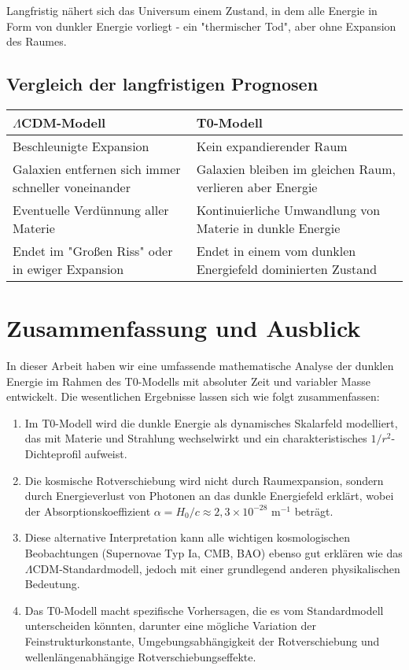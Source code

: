 \documentclass[a4paper,12pt]{article}
\theoremstyle{definition}
\theoremstyle{remark}
\begin{document}
	Langfristig nähert sich das Universum einem Zustand, in dem alle Energie in Form von dunkler Energie vorliegt - ein "thermischer Tod", aber ohne Expansion des Raumes.
	
	\subsection{Vergleich der langfristigen Prognosen}
	\begin{tcolorbox}[colback=yellow!5!white,colframe=yellow!75!black,title=Langfristige Entwicklung des Universums]
		\begin{tabular}{|p{}|p{}|}
			\hline
			\textbf{$\Lambda$CDM-Modell} & \textbf{T0-Modell} \\
			\hline
			Beschleunigte Expansion & Kein expandierender Raum \\
			\hline
			Galaxien entfernen sich immer schneller voneinander & Galaxien bleiben im gleichen Raum, verlieren aber Energie \\
			\hline
			Eventuelle Verdünnung aller Materie & Kontinuierliche Umwandlung von Materie in dunkle Energie \\
			\hline
			Endet im "Großen Riss" oder in ewiger Expansion & Endet in einem vom dunklen Energiefeld dominierten Zustand \\
			\hline
		\end{tabular}
	\end{tcolorbox}
	
	\section{Zusammenfassung und Ausblick}
	In dieser Arbeit haben wir eine umfassende mathematische Analyse der dunklen Energie im Rahmen des T0-Modells mit absoluter Zeit und variabler Masse entwickelt. Die wesentlichen Ergebnisse lassen sich wie folgt zusammenfassen:
	
	\begin{enumerate}
		\item Im T0-Modell wird die dunkle Energie als dynamisches Skalarfeld modelliert, das mit Materie und Strahlung wechselwirkt und ein charakteristisches $1/r^2$-Dichteprofil aufweist.
		\item Die kosmische Rotverschiebung wird nicht durch Raumexpansion, sondern durch Energieverlust von Photonen an das dunkle Energiefeld erklärt, wobei der Absorptionskoeffizient $\alpha = H_0/c \approx 2{,}3 \times 10^{-28} \text{ m}^{-1}$ beträgt.
		\item Diese alternative Interpretation kann alle wichtigen kosmologischen Beobachtungen (Supernovae Typ Ia, CMB, BAO) ebenso gut erklären wie das $\Lambda$CDM-Standardmodell, jedoch mit einer grundlegend anderen physikalischen Bedeutung.
		\item Das T0-Modell macht spezifische Vorhersagen, die es vom Standardmodell unterscheiden könnten, darunter eine mögliche Variation der Feinstrukturkonstante, Umgebungsabhängigkeit der Rotverschiebung und wellenlängenabhängige Rotverschiebungseffekte.
	\end{enumerate}
	
\end{document}
